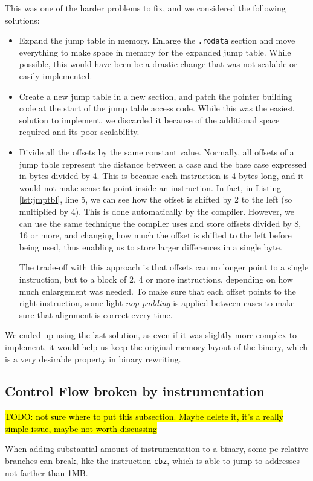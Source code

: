 \documentclass[a4paper,11pt,oneside]{report}
\newcommand{\todo}[1]{%
	\begingroup 
	\sethlcolor{cyan}%
	\hl{TODO: #1}%
	\endgroup
}
\begin{document}
This was one of the harder problems to fix, and we considered the following 
solutions:
\begin{itemize}
	\item Expand the jump table in memory. Enlarge the \texttt{.rodata} section 
		and move everything to make space in memory for the expanded jump 
		table. While possible, this would have been be a drastic change that 
		was not scalable or easily implemented.
	\item Create a new jump table in a new section, and patch the pointer 
		building code at the start of the jump table access code. While this 
		was the easiest solution to implement, we discarded it because of the 
		additional space required and its poor scalability.
	\item Divide all the offsets by the same constant value. Normally, all 
		offsets of a jump table represent the distance between a case and the 
		base case expressed in bytes divided by 4. This is because each 
		instruction is 4 bytes long, and it would not make sense to point 
		inside an instruction. In fact, in Listing \ref{lst:jmptbl}, line 5, we 
		can see how the offset is shifted by 2 to the left (so multiplied by 
		4). This is done automatically by the compiler. However, we can use the 
		same technique the compiler uses and store offsets divided by 8, 16 or 
		more, and changing how much the offset is shifted to the left before 
		being used, thus enabling us to store larger differences in a single 
		byte. 

		The trade-off with this approach is that offsets can no longer point to 
		a single instruction, but to a block of 2, 4 or more instructions, 
		depending on how much enlargement was needed. To make sure that each 
		offset points to the right instruction, some light \emph{nop-padding} 
		is applied between cases to make sure that alignment is correct every 
		time.
\end{itemize}

We ended up using the last solution, as even if it was slightly more complex to 
implement, it would help us keep the original memory layout of the binary, 
which is a very desirable property in binary rewriting. 

\subsection{Control Flow broken by instrumentation}
\todo{not sure where to put this subsection. Maybe delete it, it's a really 
simple issue, maybe not worth discussing}
When adding substantial amount of instrumentation to a binary, some pc-relative 
branches can break, like the instruction \texttt{cbz}, which is able to jump to 
addresses not farther than 1MB. 
\end{document}

